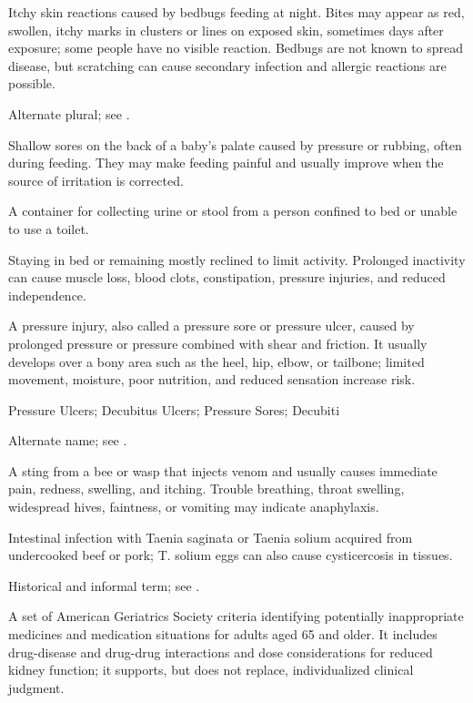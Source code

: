  Itchy skin reactions caused by bedbugs feeding at night. Bites may appear as red, swollen, itchy marks in clusters or lines on exposed skin, sometimes days after exposure; some people have no visible reaction. Bedbugs are not known to spread disease, but scratching can cause secondary infection and allergic reactions are possible.

 Alternate plural; see .

 Shallow sores on the back of a baby's palate caused by pressure or rubbing, often during feeding. They may make feeding painful and usually improve when the source of irritation is corrected.

 A container for collecting urine or stool from a person confined to bed or unable to use a toilet.

 Staying in bed or remaining mostly reclined to limit
activity. Prolonged inactivity can cause muscle loss, blood clots,
constipation, pressure injuries, and reduced independence.

 A pressure injury, also called a pressure sore or pressure ulcer, caused by prolonged pressure or pressure combined with shear and friction. It usually develops over a bony area such as the heel, hip, elbow, or tailbone; limited movement, moisture, poor nutrition, and reduced sensation increase risk.


\synonyms
Pressure Ulcers; Decubitus Ulcers; Pressure Sores; Decubiti

 Alternate name; see .

 A sting from a bee or wasp that injects venom and usually causes immediate pain, redness, swelling, and itching. Trouble breathing, throat swelling, widespread hives, faintness, or vomiting may indicate anaphylaxis.

 Intestinal infection with Taenia saginata or Taenia solium acquired from undercooked beef or pork; T. solium eggs can also cause cysticercosis in tissues.

 Historical and informal term; see .

 A set of American Geriatrics Society criteria identifying potentially inappropriate medicines and medication situations for adults aged 65 and older. It includes drug-disease and drug-drug interactions and dose considerations for reduced kidney function; it supports, but does not replace, individualized clinical judgment.

